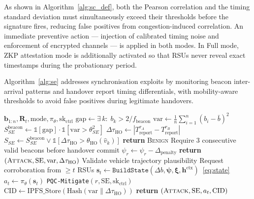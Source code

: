 As shown in Algorithm~\ref{alg:sc_def}, both the Pearson
correlation and the timing standard deviation must
simultaneously exceed their thresholds before the
signature fires, reducing false positives from
congestion-induced correlation. An immediate preventive
action --- injection of calibrated timing noise and
enforcement of encrypted channels --- is applied in both
modes. In Full mode, ZKP attestation mode is additionally
activated so that RSUs never reveal exact timestamps
during the probationary period.

Algorithm~\ref{alg:se} addresses synchronisation exploits
by monitoring beacon inter-arrival patterns and handover
report timing differentials, with mobility-aware thresholds
to avoid false positives during legitimate handovers.

\begin{algorithm}[H]
\caption{Synchronisation Exploit Detection and Mitigation
(\texttt{SE-Defend})}
\label{alg:se}
\begin{algorithmic}[1]
\small
{}
  {$\mathbf{b}_{1:n},\mathbf{R}_t,\mathrm{mode},
  \pi_\theta,\mathrm{sk}_{\mathrm{ctrl}}$}
  \State $\mathrm{gap} \gets
    \exists\,k:\;b_k > 2/f_{\mathrm{beacon}}$
  \State $\mathrm{var} \gets
    \frac{1}{n}\sum_{i=1}^{n}(b_i-\bar{b})^2$
  \State $S_{SE}^{\mathrm{beacon}} \gets
    \mathbb{1}[\mathrm{gap}]
    \cdot\mathbb{1}[\mathrm{var}>\theta_{SE}^2]$
  \State $\Delta\tau_{\mathrm{HO}} \gets
    |T_{\mathrm{report}}^{r_A} - T_{\mathrm{report}}^{r_B}|$
  \State $S_{SE} \gets S_{SE}^{\mathrm{beacon}}
    \vee \mathbb{1}[\Delta\tau_{\mathrm{HO}} >
    \theta_{\mathrm{HO}}(\hat{v}_k)]$
    \State \textbf{return} \textsc{Benign}
  \EndIf
    \State Require 3 consecutive valid beacons
      before handover commit
    \State $\psi_r \gets \psi_r - \Delta_{\mathrm{penalty}}$
    \State \textbf{return}
      $(\textsc{Attack},\mathrm{SE},\mathrm{var},
      \Delta\tau_{\mathrm{HO}})$
  \EndIf
  \State Validate vehicle trajectory plausibility
  \State Request corroboration from $\geq t$ RSUs
  \State $\mathbf{s}_t \gets \texttt{BuildState}
    (\Delta b,\boldsymbol{\psi},\boldsymbol{\xi},
    \mathbf{h}^{\mathrm{ctx}})$~\eqref{eq:state}
  \State $a_t \gets \pi_\theta(\mathbf{s}_t)$
    \State \texttt{PQC-Mitigate}$(r,\mathrm{SE},
      \mathrm{sk}_{\mathrm{ctrl}})$
  \EndIf
  \State $\mathrm{CID} \gets \mathrm{IPFS\_Store}
    (\mathrm{Hash}(\mathrm{var}\|\Delta\tau_{\mathrm{HO}}))$
  \State \textbf{return}
    $(\textsc{Attack},\mathrm{SE},a_t,\mathrm{CID})$
\EndProcedure
\end{algorithmic}
\end{algorithm}

